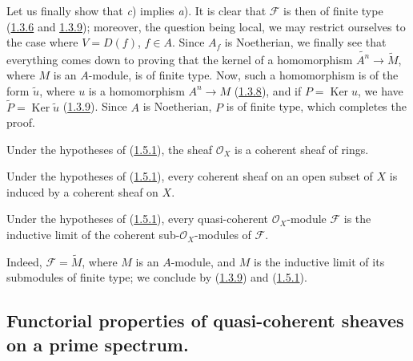 Let us finally show that \textit{c}) implies \textit{a}). It is clear that
$\mathscr{F}$ is then of finite type
(\hyperref[I.1.3.6]{1.3.6} and \hyperref[I.1.3.9]{1.3.9}); moreover,
the question being local, we may restrict ourselves to the case where
$V=D(f)$, $f\in A$. Since $A_f$ is Noetherian, we finally see that
everything comes down to proving that the kernel of a homomorphism
$\widetilde{A^n}\to\widetilde{M}$, where $M$ is an $A$-module, is of finite
type. Now, such a homomorphism is of the form $\widetilde{u}$, where $u$ is
a homomorphism $A^n\to M$ (\hyperref[I.1.3.8]{1.3.8}), and if
$P=\operatorname{Ker}u$, we have
$\widetilde{P}=\operatorname{Ker}\widetilde{u}$
(\hyperref[I.1.3.9]{1.3.9}). Since $A$ is Noetherian, $P$ is of finite
type, which completes the proof.

\begin{corollary}[1.5.2]
\label{I.1.5.2}
Under the hypotheses of (\hyperref[I.1.5.1]{1.5.1}), the sheaf
$\mathscr{O}_X$ is a coherent sheaf of rings.
\end{corollary}

\begin{corollary}[1.5.3]
\label{I.1.5.3}
Under the hypotheses of (\hyperref[I.1.5.1]{1.5.1}), every coherent
sheaf on an open subset of $X$ is induced by a coherent sheaf on $X$.
\end{corollary}

\begin{corollary}[1.5.4]
\label{I.1.5.4}
Under the hypotheses of (\hyperref[I.1.5.1]{1.5.1}), every
quasi-coherent $\mathscr{O}_X$-module $\mathscr{F}$ is the inductive limit
of the coherent sub-$\mathscr{O}_X$-modules of $\mathscr{F}$.
\end{corollary}

Indeed, $\mathscr{F}=\widetilde{M}$, where $M$ is an $A$-module, and $M$ is
the inductive limit of its submodules of finite type; we conclude by
(\hyperref[I.1.3.9]{1.3.9}) and
(\hyperref[I.1.5.1]{1.5.1}).

\subsection{Functorial properties of quasi-coherent sheaves on a prime
spectrum.}
\label{subsection:I.1.6}

